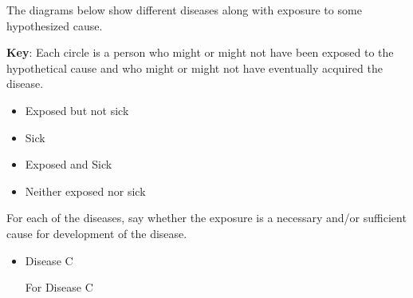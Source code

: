 \providecommand{\Person}[1]{
\draw[ultra thick] (#1) circle (.4cm);
}
\providecommand{\Exposed}[1]{
\draw[ultra thick,fill=gray!50] (#1) circle (.4cm);
}
\providecommand{\Sick}[1]{
\draw[ultra thick] (#1) -- +(.25,.25);
\draw[ultra thick] (#1) -- +(.25,-.25);
\draw[ultra thick] (#1) -- +(-.25,-.25);
\draw[ultra thick] (#1) -- +(-.25,.25);
}
\providecommand{\PersonSick}[1]{
\Person{#1}
\Sick{#1}
}
\providecommand{\ExposedSick}[1]{
\Exposed{#1}
\Sick{#1}
}

The diagrams below show different diseases along with exposure to
some hypothesized cause.  

{\bf Key}: Each circle is a person who might or might not have been exposed to the hypothetical cause and who might or might not have eventually acquired the disease.
\begin{itemize}
\item Exposed but not sick 
\item Sick 
\item Exposed and Sick 
\item Neither exposed nor sick 
\end{itemize}


For each of the diseases, say whether the
exposure is a necessary and/or sufficient cause for development of the disease.

\begin{itemize}
\item Disease C



For Disease C

\begin{MultipleChoice}[itemname=nec-and-suff-c]
\end{MultipleChoice}
\end{itemize}

